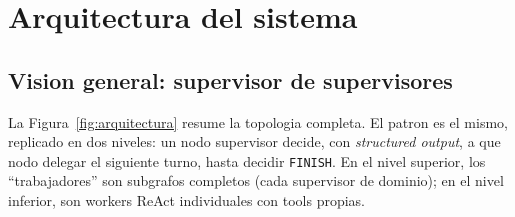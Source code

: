 \documentclass[11pt]{article}
\begin{document}
\section{Arquitectura del sistema}

\subsection{Vision general: supervisor de supervisores}

La Figura~\ref{fig:arquitectura} resume la topologia completa. El patron es
el mismo, replicado en dos niveles: un nodo supervisor decide, con
\emph{structured output}, a que nodo delegar el siguiente turno, hasta decidir
\texttt{FINISH}. En el nivel superior, los ``trabajadores'' son subgrafos
completos (cada supervisor de dominio); en el nivel inferior, son workers
ReAct individuales con tools propias.
\end{document}

